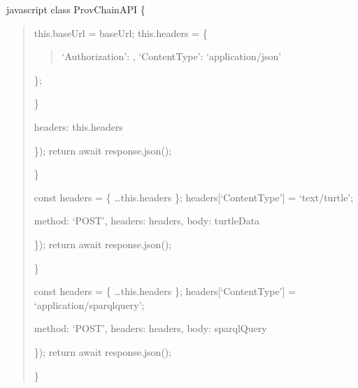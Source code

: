 \documentclass[letterpaper,10pt,english]{sphinxmanual}
\begin{document}
\sphinxAtStartPar
{\color{red}\bfseries{}\textasciigrave{}\textasciigrave{}}{\color{red}\bfseries{}\textasciigrave{}}javascript
class ProvChainAPI \{
\begin{quote}
\begin{description}
\sphinxAtStartPar
this.baseUrl = baseUrl;
this.headers = \{
\begin{quote}

\sphinxAtStartPar
‘Authorization’: ,
‘Content\sphinxhyphen{}Type’: ‘application/json’
\end{quote}

\sphinxAtStartPar
\};

\end{description}

\sphinxAtStartPar
\}
\begin{description}
\begin{description}
\sphinxAtStartPar
headers: this.headers

\end{description}

\sphinxAtStartPar
\});
return await response.json();

\end{description}

\sphinxAtStartPar
\}
\begin{description}
\sphinxAtStartPar
const headers = \{ …this.headers \};
headers{[}‘Content\sphinxhyphen{}Type’{]} = ‘text/turtle’;
\begin{description}
\sphinxAtStartPar
method: ‘POST’,
headers: headers,
body: turtleData

\end{description}

\sphinxAtStartPar
\});
return await response.json();

\end{description}

\sphinxAtStartPar
\}
\begin{description}
\sphinxAtStartPar
const headers = \{ …this.headers \};
headers{[}‘Content\sphinxhyphen{}Type’{]} = ‘application/sparql\sphinxhyphen{}query’;
\begin{description}
\sphinxAtStartPar
method: ‘POST’,
headers: headers,
body: sparqlQuery

\end{description}

\sphinxAtStartPar
\});
return await response.json();

\end{description}

\sphinxAtStartPar
\}
\end{quote}
\end{document}
